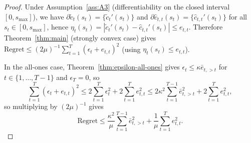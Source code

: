 \documentclass[11pt]{article}
\newtheorem{theorem}{Theorem}[section]
\newcommand{\1}{\mathbf{1}}
\newcommand{\mcal}{\mathcal{M}}
\newcommand{\subdiff}{\partial}
\begin{document}
\begin{proof}
  Under Assumption~\ref{ass:A3} (differentiability on the closed interval $[0,s_{\max}]$), we have $\subdiff \tilde{c}_t(s_t)=\{\tilde{c}_t'(s_t)\}$ and $\subdiff \hat{c}_{t,t}(s_t)=\{\hat{c}_{t,t}'(s_t)\}$ for all $s_t \in [0,s_{\max}]$, hence $\eta_t(s_t)=|\tilde{c}_t'(s_t)-\hat{c}_{t,t}'(s_t)|\leq e_{t,t}$.
  Therefore Theorem~\ref{thm:main} (strongly convex case) gives $\mathrm{Regret} \leq (2\mu)^{-1}\sum_{t=1}^{T} (\epsilon_t+e_{t,t})^2$ (using $\eta_t(s_t)\le e_{t,t}$).

  In the all-ones case, Theorem~\ref{thm:epsilon-all-ones} gives $\epsilon_t \leq \kappa \bar{e}_{t,>t}$ for $t \in \{1,\dots,T-1\}$ and $\epsilon_T=0$, so
  \begin{equation*}
    \sum_{t=1}^{T} (\epsilon_t+e_{t,t})^2
    \leq 2\sum_{t=1}^{T} \epsilon_t^2 + 2\sum_{t=1}^{T} e_{t,t}^2
    \leq 2\kappa^2\sum_{t=1}^{T-1} \bar{e}_{t,>t}^{2} + 2\sum_{t=1}^{T} e_{t,t}^2,
  \end{equation*}
  so multiplying by $(2\mu)^{-1}$ gives
  \begin{equation*}
    \mathrm{Regret}
    \leq \frac{\kappa^2}{\mu}\sum_{t=1}^{T-1} \bar{e}_{t,>t}^{2} + \frac{1}{\mu}\sum_{t=1}^{T} e_{t,t}^2.
  \end{equation*}
  \qedhere
\end{proof}



\end{document}
